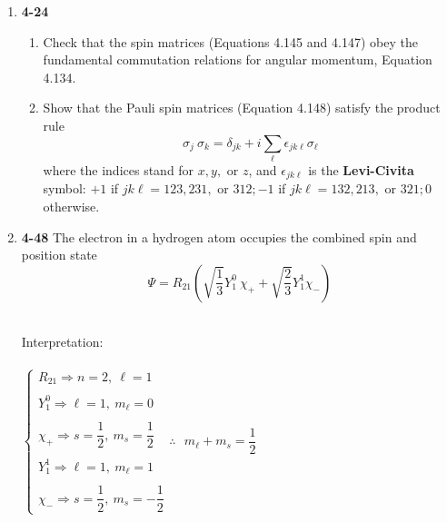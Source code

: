\documentclass[fleqn]{article}
\begin{document}
  \begin{enumerate}
    \item \textbf{4-24}
    \begin{enumerate}
      \item Check that the spin matrices (Equations 4.145 and 4.147) obey the fundamental commutation relations for angular momentum, Equation 4.134.

          

      \item Show that the Pauli spin matrices (Equation 4.148) satisfy the product rule 
      $$
        \sigma_j ~ \sigma_k=\delta_{jk}+i \sum\limits_{\ell} \epsilon_{jk \ell} \sigma_{\ell}
      $$
      where the indices stand for $x, y,$ or $z$, and $\epsilon_{jk \ell}$ is the \textbf{Levi-Civita} symbol: $+1$ if 
      $jk \ell=123, 231,$ or $312; -1$ if $jk \ell=132, 213,$ or $321; 0$ otherwise.


    \end{enumerate}

    \item \textbf{4-48} The electron in a hydrogen atom occupies the combined spin and position state
    $$
      \Psi=R_{21} \left(
        \sqrt{\dfrac{1}{3}} Y_1^0 ~ \chi_+ +\sqrt{\dfrac{2}{3}} Y_1^1 \chi_-
      \right)
    $$

    \textcolor{hwColor}{
      \\
      Interpretation:
      \\
      \\
      $
        \begin{cases}
          R_{21} \Longrightarrow n=2, ~ \ell=1
          \\
          \\
          Y_1^0 \Longrightarrow \ell=1, ~ m_{\ell}=0
          \\
          \\
          \chi_+ \Longrightarrow s=\dfrac{1}{2}, ~ m_s=\dfrac{1}{2}
          \\
          \\
          Y_1^1 \Longrightarrow \ell=1, ~ m_{\ell}=1
          \\
          \\
          \chi_- \Longrightarrow s=\dfrac{1}{2}, ~ m_s=-\dfrac{1}{2}
        \end{cases}
        \therefore ~~~ m_{\ell}+m_s=\dfrac{1}{2}
      $
    }


\end{enumerate}
\end{document}

